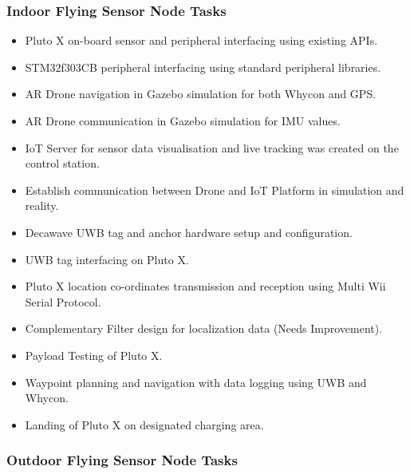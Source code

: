 \documentclass[a4paper,12pt,oneside]{book}
\begin{document}
\subsubsection{Indoor Flying Sensor Node Tasks} 

\begin{itemize}
\item Pluto X on-board sensor and peripheral interfacing using existing APIs.
\item STM32f303CB peripheral interfacing using standard peripheral libraries.
\item AR Drone navigation in Gazebo simulation for both Whycon and GPS.
\item AR Drone communication in Gazebo simulation for IMU values.
\item IoT Server for sensor data visualisation and live tracking was created on the control station.
\item Establish communication between Drone and IoT Platform in simulation and reality.
\item Decawave UWB tag and anchor hardware setup and configuration.
\item UWB tag interfacing on Pluto X.
\item Pluto X location co-ordinates transmission and reception using Multi Wii Serial Protocol.
\item Complementary Filter design for localization data (Needs Improvement).
\item Payload Testing of Pluto X.
\item Waypoint planning and navigation with data logging using UWB and Whycon.
\item Landing of Pluto X on designated charging area. 
\end{itemize}

\subsubsection{Outdoor Flying Sensor Node Tasks} 
\end{document}
